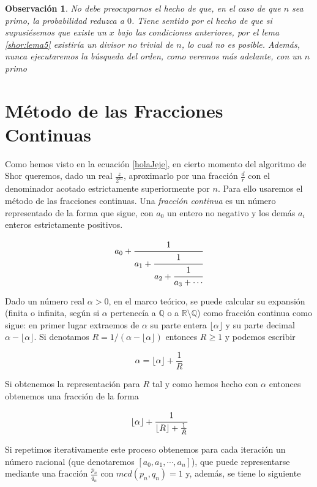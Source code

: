 \documentclass[11pt, spanish]{report}
\numberwithin{equation}{section}
\newtheorem{obs}[defin]{Observación}
\numberwithin{defin}{section}
\begin{document}
\begin{obs}
No debe preocuparnos el hecho de que, en el caso de que $n$ sea primo, la probabilidad reduzca a $0$. Tiene sentido por el hecho de que si supusiésemos que existe un $x$ bajo las condiciones anteriores, por el lema \ref{shor:lema5} existiría un divisor no trivial de $n$, lo cual no es posible. Además, nunca ejecutaremos la búsqueda del orden, como veremos más adelante, con un $n$ primo
\end{obs}


\section{Método de las Fracciones Continuas}
\label{fraccionesContinuas}
Como hemos visto en la ecuación \ref{holaJeje}, en cierto momento del algoritmo de Shor queremos, dado un real $\frac{z}{2^m}$, aproximarlo por una fracción $\frac{d}{r}$ con el denominador acotado estrictamente superiormente por $n$. Para ello usaremos el método de las fracciones continuas. Una \textit{fracción continua} es un número representado de la forma que sigue, con $a_0$ un entero no negativo y los demás $a_i$ enteros estrictamente positivos.

\begin{equation}
a_0+\cfrac{1}{a_1+\cfrac{1}{a_2+\cfrac{1}{a_3+\cdots}}}
\end{equation}

Dado un número real $\alpha >0$, en el marco teórico, se puede calcular su expansión (finita o infinita, según si $\alpha$ pertenecía a $\mathbb{Q}$ o a $\mathbb{R}\setminus \mathbb{Q}$) como fracción continua como sigue: en primer lugar extraemos de $\alpha$ su parte entera $\lfloor \alpha \rfloor$ y su parte decimal $\alpha-\lfloor\alpha\rfloor$. Si denotamos $R=1/(\alpha-\lfloor\alpha\rfloor)$ entonces $R\geq 1$ y podemos escribir 

\begin{equation}
\alpha=\lfloor\alpha\rfloor + \frac{1}{R}
\end{equation}

Si obtenemos la representación para $R$ tal y como hemos hecho con $\alpha$ entonces obtenemos una fracción de la forma

\begin{equation}
\lfloor\alpha\rfloor+\cfrac{1}{\lfloor R \rfloor+\frac{1}{\tilde{R}}}
\end{equation}

Si repetimos iterativamente este proceso obtenemos para cada iteración un número racional (que denotaremos $[a_0,a_1,\cdots,a_n]$), que puede representarse mediante una fracción $\frac{p_n}{q_n}$ con $mcd(p_n,q_n)=1$ y, además, se tiene lo siguiente 
\end{document}
